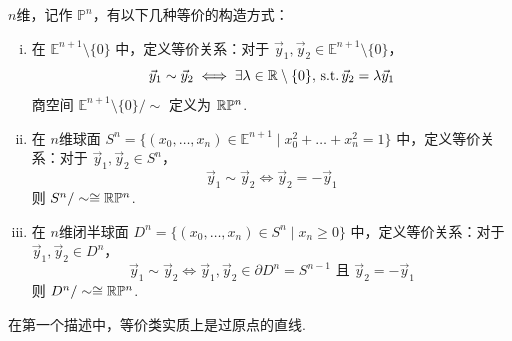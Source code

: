 \begin{definition}[射影空间][def:8.3]
    $n$维，记作 $\mathbb{P}^n$，有以下几种等价的构造方式：
    \begin{enumerate}[(i)]
        \item 在 $\mathbb{E}^{n+1}\setminus\{0\}$ 中，定义等价关系：对于 $\vec{y}_1, \vec{y}_2 \in \mathbb{E}^{n+1}\setminus\{0\}$，
        \[ \vec{y}_1 \sim \vec{y}_2 \iff \exists \lambda \in \mathbb{R}\setminus\{0\}, \operatorname{\,\text{s.t.}} \vec{y}_2 = \lambda \vec{y}_1 \]
        商空间 $\mathbb{E}^{n+1}\setminus\{0\}/\sim$ 定义为 $\mathbb{R}\mathbb{P}^n$.
        \item 在 $n$维球面 $S^n = \{ (x_0, \dots, x_n) \in \mathbb{E}^{n+1} \mid x_0^2 + \dots + x_n^2 = 1 \}$ 中，定义等价关系：对于 $\vec{y}_1, \vec{y}_2 \in S^n$，
        \[ \vec{y}_1 \sim \vec{y}_2 \iff \vec{y}_2 = -\vec{y}_1 \]
        则 $S^n/\sim \cong \mathbb{R}\mathbb{P}^n$.
        \item 在 $n$维闭半球面 $D^n = \{ (x_0, \dots, x_n) \in S^n \mid x_n \geq 0 \}$ 中，定义等价关系：对于 $\vec{y}_1, \vec{y}_2 \in D^n$，
        \[ \vec{y}_1 \sim \vec{y}_2 \iff \vec{y}_1, \vec{y}_2 \in \partial D^n = S^{n-1} \text{ 且 } \vec{y}_2 = -\vec{y}_1 \]
        则 $D^n/\sim \cong \mathbb{R}\mathbb{P}^n$.
    \end{enumerate}
\end{definition}
在第一个描述中，等价类实质上是过原点的直线.




